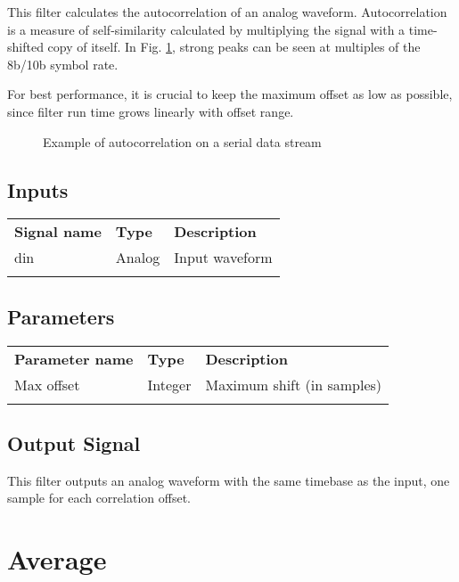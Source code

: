 This filter calculates the autocorrelation of an analog waveform. Autocorrelation is a measure of self-similarity
calculated by multiplying the signal with a time-shifted copy of itself. In Fig. \ref{filter_autocorr}, strong peaks
can be seen at multiples of the 8b/10b symbol rate.

For best performance, it is crucial to keep the maximum offset as low as possible, since filter run time grows linearly
with offset range.

\begin{figure}[h]
\centering
{}
\caption{Example of autocorrelation on a serial data stream}
\label{filter_autocorr}
\end{figure}

\subsection{Inputs}

\begin{tabularx}{16cm}{llX}
\thickhline
\textbf{Signal name} & \textbf{Type} & \textbf{Description} \\
\thickhline
din & Analog & Input waveform \\
\thickhline
\end{tabularx}

\subsection{Parameters}

\begin{tabularx}{16cm}{llX}
\thickhline
\textbf{Parameter name} & \textbf{Type} & \textbf{Description} \\
\thickhline
Max offset & Integer & Maximum shift (in samples)\\
\thickhline
\end{tabularx}

\subsection{Output Signal}

This filter outputs an analog waveform with the same timebase as the input, one sample for each correlation offset.

\pagebreak
\section{Average}
\label{filter:average}

